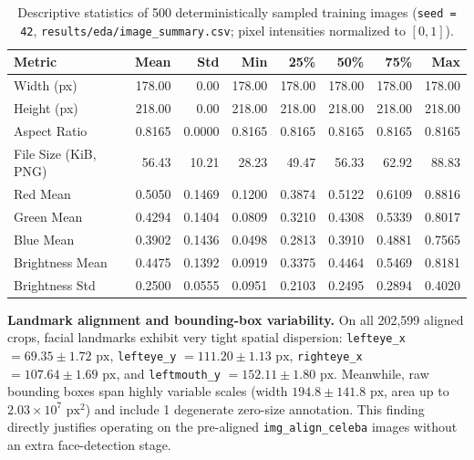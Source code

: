 \documentclass[12pt,a4paper]{article}
\newcommand{\code}[1]{\texttt{#1}}
\begin{document}
\begin{table}[H]
  \centering
  \caption[Descriptive statistics of 500 sampled training images]{Descriptive statistics of 500 deterministically sampled training images (\code{seed = 42}, \code{results/\allowbreak{}eda/\allowbreak{}image\_\allowbreak{}summary.csv}; pixel intensities normalized to $[0, 1]$).}
  \label{tab:image_summary}
  \small
  \begin{tabular}{@{}l r r r r r r r@{}}
    \toprule
    \textbf{Metric} & \textbf{Mean} & \textbf{Std} & \textbf{Min} & \textbf{25\%} & \textbf{50\%} & \textbf{75\%} & \textbf{Max} \\
    \midrule
    Width (px)        & 178.00 & 0.00  & 178.00 & 178.00 & 178.00 & 178.00 & 178.00 \\
    Height (px)       & 218.00 & 0.00  & 218.00 & 218.00 & 218.00 & 218.00 & 218.00 \\
    Aspect Ratio      & 0.8165 & 0.0000 & 0.8165 & 0.8165 & 0.8165 & 0.8165 & 0.8165 \\
    File Size (KiB, PNG) & 56.43 & 10.21 & 28.23 & 49.47 & 56.33 & 62.92 & 88.83 \\
    Red Mean          & 0.5050 & 0.1469 & 0.1200 & 0.3874 & 0.5122 & 0.6109 & 0.8816 \\
    Green Mean        & 0.4294 & 0.1404 & 0.0809 & 0.3210 & 0.4308 & 0.5339 & 0.8017 \\
    Blue Mean         & 0.3902 & 0.1436 & 0.0498 & 0.2813 & 0.3910 & 0.4881 & 0.7565 \\
    Brightness Mean   & 0.4475 & 0.1392 & 0.0919 & 0.3375 & 0.4464 & 0.5469 & 0.8181 \\
    Brightness Std    & 0.2500 & 0.0555 & 0.0951 & 0.2103 & 0.2495 & 0.2894 & 0.4020 \\
    \bottomrule
  \end{tabular}
\end{table}

\textbf{Landmark alignment and bounding-box variability.} On all 202,599 aligned crops, facial landmarks exhibit very tight spatial dispersion: \code{lefteye\_\allowbreak{}x} $= 69.35 \pm 1.72\text{ px}$, \code{lefteye\_\allowbreak{}y} $= 111.20 \pm 1.13\text{ px}$, \code{righteye\_\allowbreak{}x} $= 107.64 \pm 1.69\text{ px}$, and \code{leftmouth\_\allowbreak{}y} $= 152.11 \pm 1.80\text{ px}$. Meanwhile, raw bounding boxes span highly variable scales (width $194.8 \pm 141.8\text{ px}$, area up to $2.03 \times 10^{7}\text{ px}^2$) and include 1 degenerate zero-size annotation. This finding directly justifies operating on the pre-aligned \code{img\_\allowbreak{}align\_\allowbreak{}celeba} images without an extra face-detection stage.
\end{document}
